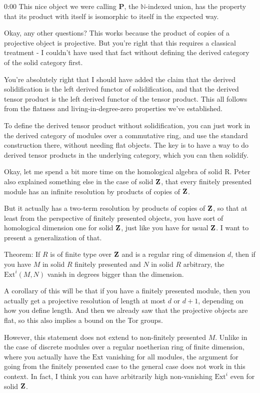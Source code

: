 \begin{unfinished}{0:00}
This nice object we were calling $\mathbf{P}$, the $\mathbb{N}$-indexed union, has the property that its product with itself is isomorphic to itself in the expected way.

Okay, any other questions? This works because the product of copies of a projective object is projective. But you're right that this requires a classical treatment - I couldn't have used that fact without defining the derived category of the solid category first.

You're absolutely right that I should have added the claim that the derived solidification is the left derived functor of solidification, and that the derived tensor product is the left derived functor of the tensor product. This all follows from the flatness and living-in-degree-zero properties we've established.

To define the derived tensor product without solidification, you can just work in the derived category of modules over a commutative ring, and use the standard construction there, without needing flat objects. The key is to have a way to do derived tensor products in the underlying category, which you can then solidify.

Okay, let me spend a bit more time on the homological algebra of solid R. Peter also explained something else in the case of solid $\mathbf Z$, that every finitely presented module has an infinite resolution by products of copies of $\mathbf Z$.

But it actually has a two-term resolution by products of copies of $\mathbf Z$, so that at least from the perspective of finitely presented objects, you have sort of homological dimension one for solid $\mathbf Z$, just like you have for usual $\mathbf Z$. I want to present a generalization of that.

Theorem: If $R$ is of finite type over $\mathbf Z$ and is a regular ring of dimension $d$, then if you have $M$ in solid $R$ finitely presented and $N$ in solid $R$ arbitrary, the $\text{Ext}^i(M, N)$ vanish in degrees bigger than the dimension.

A corollary of this will be that if you have a finitely presented module, then you actually get a projective resolution of length at most $d$ or $d+1$, depending on how you define length. And then we already saw that the projective objects are flat, so this also implies a bound on the Tor groups.

However, this statement does not extend to non-finitely presented $M$. Unlike in the case of discrete modules over a regular noetherian ring of finite dimension, where you actually have the $\text{Ext}$ vanishing for all modules, the argument for going from the finitely presented case to the general case does not work in this context. In fact, I think you can have arbitrarily high non-vanishing $\text{Ext}^i$ even for solid $\mathbf Z$.


\end{unfinished}
